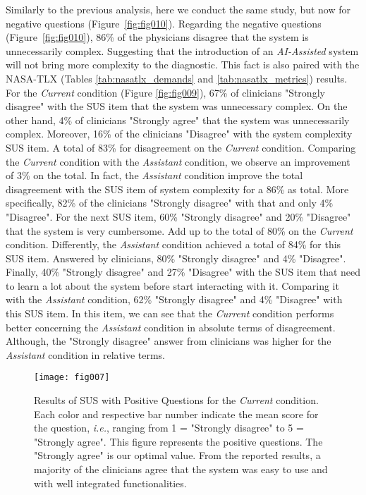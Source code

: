 Similarly to the previous analysis, here we conduct the same study, but now for negative questions (Figure~\ref{fig:fig010}).
Regarding the negative questions (Figure~\ref{fig:fig010}), 86\% of the physicians disagree that the system is unnecessarily complex.
Suggesting that the introduction of an {\it AI-Assisted} system will not bring more complexity to the diagnostic.
This fact is also paired with the NASA-TLX (Tables \ref{tab:nasatlx_demands} and \ref{tab:nasatlx_metrics}) results.
For the {\it Current} condition (Figure \ref{fig:fig009}), 67\% of clinicians "Strongly disagree" with the SUS item that the system was unnecessary complex.
On the other hand, 4\% of clinicians "Strongly agree" that the system was unnecessarily complex.
Moreover, 16\% of the clinicians "Disagree" with the system complexity SUS item.
A total of 83\% for disagreement on the {\it Current} condition.
Comparing the {\it Current} condition with the {\it Assistant} condition, we observe an improvement of 3\% on the total.
In fact, the {\it Assistant} condition improve the total disagreement with the SUS item of system complexity for a 86\% as total.
More specifically, 82\% of the clinicians "Strongly disagree" with that and only 4\% "Disagree".
For the next SUS item, 60\% "Strongly disagree" and 20\% "Disagree" that the system is very cumbersome.
Add up to the total of 80\% on the {\it Current} condition.
Differently, the {\it Assistant} condition achieved a total of 84\% for this SUS item.
Answered by clinicians, 80\% "Strongly disagree" and 4\% "Disagree".
Finally, 40\% "Strongly disagree" and 27\% "Disagree" with the SUS item that need to learn a lot about the system before start interacting with it.
Comparing it with the {\it Assistant} condition, 62\% "Strongly disagree" and 4\% "Disagree" with this SUS item.
In this item, we can see that the {\it Current} condition performs better concerning the {\it Assistant} condition in absolute terms of disagreement.
Although, the "Strongly disagree" answer from clinicians was higher for the {\it Assistant} condition in relative terms.

\begin{figure}[htbp]
\centering
\texttt{[image: fig007]}
\caption{Results of SUS with Positive Questions for the {\it Current} condition. Each color and respective bar number indicate the mean score for the question, {\it i.e.}, ranging from 1 = "Strongly disagree" to 5 = "Strongly agree". This figure represents the positive questions. The "Strongly agree" is our optimal value. From the reported results, a majority of the clinicians agree that the system was easy to use and with well integrated functionalities.}
\label{fig:fig007}
\end{figure}

